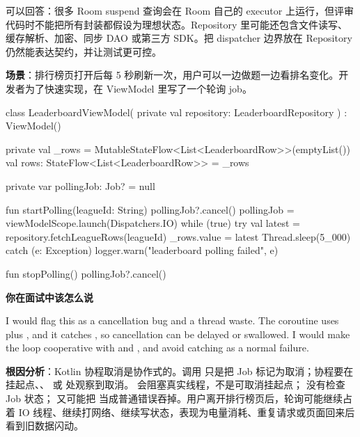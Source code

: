 \begin{followup}
可以回答：很多 Room suspend 查询会在 Room 自己的 executor 上运行，但评审代码时不能把所有封装都假设为理想状态。Repository 里可能还包含文件读写、缓存解析、加密、同步 DAO 或第三方 SDK。把 dispatcher 边界放在 Repository 仍然能表达契约，并让测试更可控。
\end{followup}


\textbf{场景}：排行榜页打开后每 5 秒刷新一次，用户可以一边做题一边看排名变化。开发者为了快速实现，在 ViewModel 里写了一个轮询 job。

\begin{ktbug}
class LeaderboardViewModel(
    private val repository: LeaderboardRepository
) : ViewModel() {

    private val _rows = MutableStateFlow<List<LeaderboardRow>>(emptyList())
    val rows: StateFlow<List<LeaderboardRow>> = _rows

    private var pollingJob: Job? = null

    fun startPolling(leagueId: String) {
        pollingJob?.cancel()
        pollingJob = viewModelScope.launch(Dispatchers.IO) {
            while (true) {
                try {
                    val latest = repository.fetchLeagueRows(leagueId)
                    _rows.value = latest
                    Thread.sleep(5_000)
                } catch (e: Exception) {
                    logger.warn("leaderboard polling failed", e)
                }
            }
        }
    }

    fun stopPolling() {
        pollingJob?.cancel()
    }
}
\end{ktbug}

\textbf{你在面试中该怎么说}
\begin{sayit}[取消语义]
I would flag this as a cancellation bug and a thread waste. The coroutine uses  plus , and it catches , so cancellation can be delayed or swallowed. I would make the loop cooperative with  and , and avoid catching  as a normal failure.
\end{sayit}

\textbf{根因分析}：Kotlin 协程取消是协作式的。调用  只是把 Job 标记为取消；协程要在挂起点、、 或  处观察到取消。 会阻塞真实线程，不是可取消挂起点； 没有检查 Job 状态； 又可能把  当成普通错误吞掉。用户离开排行榜页后，轮询可能继续占着 IO 线程、继续打网络、继续写状态，表现为电量消耗、重复请求或页面回来后看到旧数据闪动。 \srcinferred

